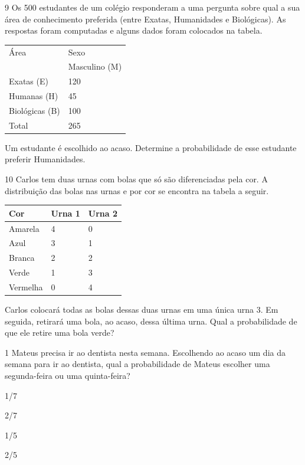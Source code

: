 \pagebreak
\num{9} Os 500 estudantes de um colégio responderam a uma pergunta sobre
qual a sua área de conhecimento preferida (entre Exatas, Humanidades e
Biológicas). As respostas foram computadas e alguns dados foram colocados
na tabela.

\begin{longtable}[]{@{}ll@{}}
\toprule
Área & Sexo\tabularnewline
& Masculino (M)\tabularnewline
Exatas (E) & 120\tabularnewline
Humanas (H) & 45\tabularnewline
Biológicas (B) & 100\tabularnewline
Total & 265\tabularnewline
\bottomrule
\end{longtable}

Um estudante é escolhido ao acaso. Determine a probabilidade de esse
estudante preferir Humanidades.

\vspace{2cm}

\num{10} Carlos tem duas urnas com bolas que só são diferenciadas pela
cor. A distribuição das bolas nas urnas e por cor se encontra na tabela
a seguir.

\begin{longtable}[]{@{}lll@{}}
\toprule
Cor & Urna 1 & Urna 2\tabularnewline
\midrule
\endhead
Amarela & 4 & 0\tabularnewline
Azul & 3 & 1\tabularnewline
Branca & 2 & 2\tabularnewline
Verde & 1 & 3\tabularnewline
Vermelha & 0 & 4\tabularnewline
\bottomrule
\end{longtable}

Carlos colocará todas as bolas dessas duas urnas em uma única urna 3. Em
seguida, retirará uma bola, ao acaso, dessa última urna. Qual a
probabilidade de que ele retire uma bola verde?


\pagebreak
{}

\num{1} Mateus precisa ir ao dentista nesta semana. Escolhendo ao acaso um
dia da semana para ir ao dentista, qual a probabilidade de Mateus
escolher uma segunda-feira ou uma quinta-feira?

\begin{minipage}{.5\textwidth}
\begin{escolha}
\item
  1/7
\item
  2/7
\item
  1/5
\item
  2/5
\end{escolha}
\end{minipage}

